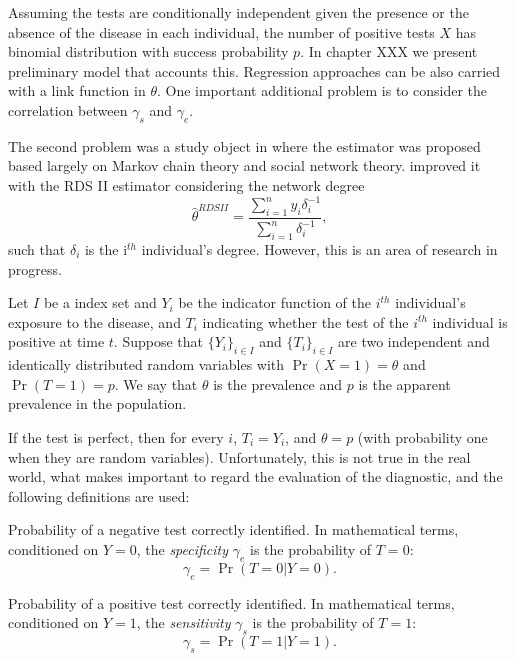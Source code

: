 Assuming the tests are conditionally independent given the presence or the
absence of the disease in each individual, the number of positive tests $X$
has binomial distribution with success probability $p$. In chapter
XXX we present preliminary model that
accounts this.  Regression approaches can be also carried with a link function
in $\theta$. One important additional problem is to consider the
correlation between $\gamma_s$ and $\gamma_e$. 


The second problem was a study object in \cite{heckathorn1997,heckathorn2002} where the estimator was proposed
based largely on Markov chain theory and social network theory.
\cite{volz2008probability} improved it with the RDS II estimator considering
the network degree
\begin{equation}
    \hat{\theta}^{RDS II} = \frac{\sum_{i=1}^n y_i \delta_i^{-1}}{\sum_{i=1}^n \delta_i^{-1}},
\end{equation}
such that $\delta_i$ is the i$^{th}$ individual's degree. However, this is an
area of research in progress. 



Let $I$ be a index set and $Y_i$ be the indicator function of the $i^{th}$ individual's exposure to the disease, and $T_i$
indicating whether the test of the $i^{th}$ individual is positive at time
$t$. Suppose that $\{Y_i\}_{i \in I}$ and $\{T_i\}_{i \in I}$ are two independent and identically distributed
random variables with $\Pr(X = 1) = \theta$ and $\Pr(T = 1) = p$. We say that
$\theta$ is the prevalence and $p$ is the apparent prevalence in the
population. 

If the test is perfect, then for every $i$, $T_i = Y_i$, and
$\theta = p$ (with probability one when they are random variables).
Unfortunately, this is not true in the real world, what makes important to
regard the evaluation of the diagnostic, and the following definitions are used:

\begin{definition}[Specificity]
  Probability of a negative test correctly identified. In mathematical terms,
  conditioned on $Y = 0$, the {\em specificity} $\gamma_e$ is the probability of $T = 0$: 
  \begin{equation}
    \gamma_e = \Pr(T = 0|Y = 0). 
  \end{equation} 
\end{definition}

\begin{definition}[Sensitivity]
  Probability of a positive test correctly identified. In mathematical terms,
  conditioned on $Y = 1$, the {\em sensitivity} $\gamma_s$ is the probability of $T = 1$: 
  \begin{equation}
    \gamma_s = \Pr(T = 1|Y = 1). 
  \end{equation} 
\end{definition}

